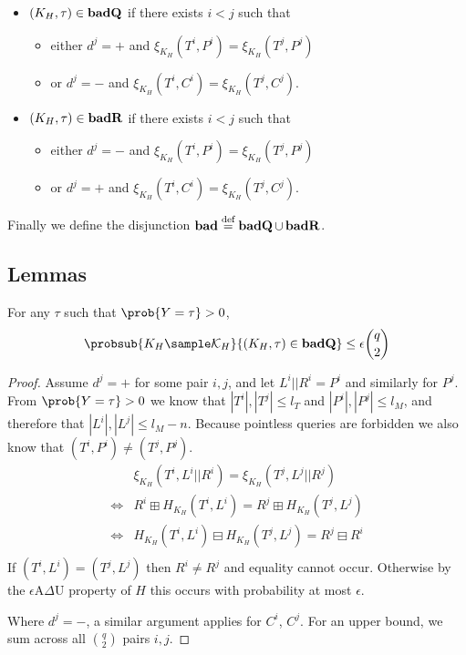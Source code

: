 \documentclass[eprint.tex]{subfiles}
\begin{document}
\begin{itemize}
    \item $(K_H, \tau) \in \operatorname{\mathbf{badQ}}$ if there exists $i < j$ such that
    \begin{itemize}
        \item either $d^j = +$ and $\xi_{K_H}(T^i, P^i) = \xi_{K_H}(T^j, P^j)$
        \item or $d^j = -$ and $\xi_{K_H}(T^i, C^i) = \xi_{K_H}(T^j, C^j)$.
    \end{itemize}
    \item $(K_H, \tau) \in \operatorname{\mathbf{badR}}$ if there exists $i < j$ such that
    \begin{itemize}
        \item either $d^j = -$ and $\xi_{K_H}(T^i, P^i) = \xi_{K_H}(T^j, P^j)$
        \item or $d^j = +$ and $\xi_{K_H}(T^i, C^i) = \xi_{K_H}(T^j, C^j)$.
    \end{itemize}
\end{itemize}

Finally we define the disjunction
$\operatorname{\mathbf{bad}} \stackrel{\text{def}}{=} \operatorname{\mathbf{badQ}} \cup \operatorname{\mathbf{badR}}$.

\subsection{Lemmas}
\begin{lemma} \label{badQ}
    For any $\tau$ such that $\prob{Y = \tau} > 0$,
    \begin{displaymath}
        \probsub{K_H \sample \mathcal{K}_H}{(K_H, \tau) \in \badQ}
        \leq \epsilon \binom{q}{2}
    \end{displaymath}
\end{lemma}

\begin{proof}
Assume $d^j = +$ for some pair $i, j$, and let $L^i || R^i = P^i$ and similarly for $P^j$.
From $\prob{Y = \tau} > 0$ we know that $|T^i|, |T^j| \leq l_T$ and $|P^i|, |P^j| \leq l_M$,
and therefore that $|L^i|, |L^j| \leq l_M - n$.
Because pointless queries are forbidden we also know that $(T^i, P^i) \neq (T^j, P^j)$.
%
\begin{align*}
    &\xi_{K_H}(T^i, L^i||R^i) = \xi_{K_H}(T^j, L^j||R^j) \\
    \Leftrightarrow& R^i \boxplus H_{K_H}(T^i, L^i) = R^j \boxplus H_{K_H}(T^j, L^j) \\
    \Leftrightarrow& H_{K_H}(T^i, L^i) \boxminus H_{K_H}(T^j, L^j) = R^j \boxminus R^i \\
\end{align*}
%
If $(T^i, L^i) = (T^j, L^j)$ then $R^i \neq R^j$ and equality cannot occur.
Otherwise by the $\epsilon$A$\Delta$U property of $H$ this occurs with probability
at most $\epsilon$.

Where $d^j = -$, a similar argument applies for $C^i$, $C^j$.
For an upper bound, we sum across all $\binom{q}{2}$ pairs $i, j$.
\end{proof}
\end{document}
